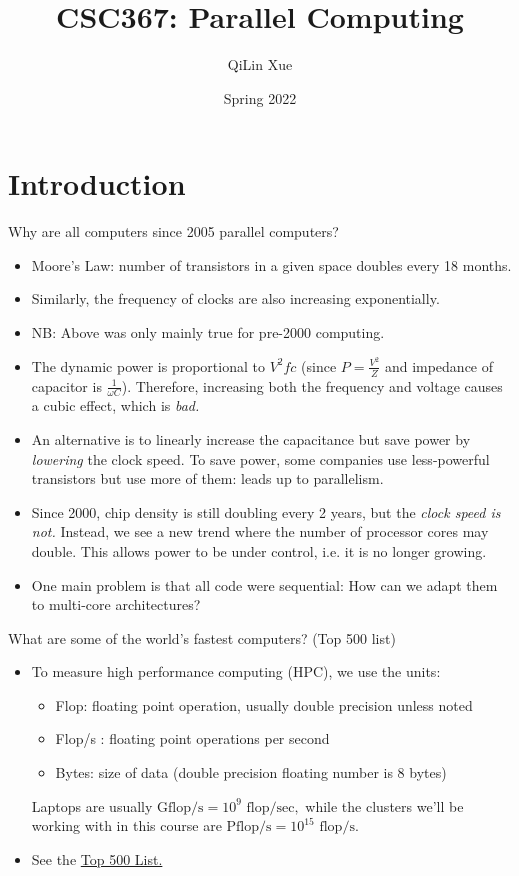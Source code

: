 \documentclass{article}
\title{CSC367: Parallel Computing}
\author{QiLin Xue}
\date{Spring 2022}
\numberwithin{equation}{section}
\begin{document}
\maketitle
\tableofcontents
\newpage
\section{Introduction}
Why are all computers since 2005 parallel computers?
\begin{itemize}
    \item Moore's Law: number of transistors in a given space doubles every 18 months.
    \item Similarly, the frequency of clocks are also increasing exponentially.
    \item NB: Above was only mainly true for pre-2000 computing.
    \item {} The dynamic power is proportional to $V^2fc$ (since $P=\frac{V^2}{Z}$ and impedance of capacitor is $\frac{1}{\omega C}$). Therefore, increasing both the frequency and voltage causes a cubic effect, which is \textit{bad.}
    \item An alternative is to linearly increase the capacitance but save power by \textit{lowering} the clock speed. To save power, some companies use less-powerful transistors but use more of them: leads up to parallelism.
    \item Since 2000, chip density is still doubling every 2 years, but the \textit{clock speed is not.} Instead, we see a new trend where the number of processor cores may double. This allows power to be under control, i.e. it is no longer growing.
    \item One main problem is that all code were sequential: How can we adapt them to multi-core architectures?
\end{itemize}
What are some of the world's fastest computers? (Top 500 list)
\begin{itemize}
    \item To measure high performance computing (HPC), we use the units:
    \begin{itemize}
        \item Flop: floating point operation, usually double precision unless noted 
        \item Flop/s : floating point operations per second
        \item Bytes: size of data (double precision floating number is 8 bytes)
    \end{itemize}
    Laptops are usually $\text{Gflop/s} = 10^9\text{ flop/sec},$ while the clusters we'll be working with in this course are $\text{Pflop/s}=10^{15}\text{ flop/s}.$
    \item See the \href{https://www.top500.org/lists/top500/list/2022/11/}{Top 500 List.}
\end{itemize}
\end{document}
